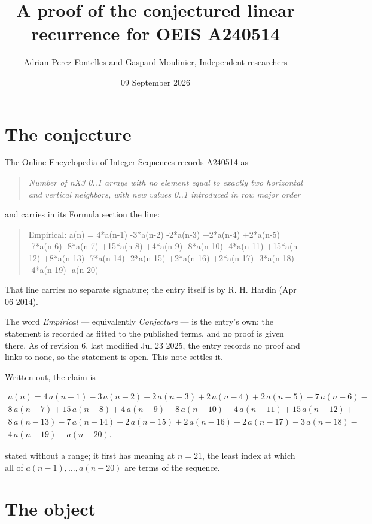 \documentclass[11pt]{article}
\title{A proof of the conjectured linear recurrence for OEIS A240514}
\author{Adrian Perez Fontelles and Gaspard Moulinier, Independent researchers}
\date{09 September 2026}
\theoremstyle{definition}
\begin{document}
\maketitle
\section{The conjecture}

The Online Encyclopedia of Integer Sequences records \href{https://oeis.org/A240514}{A240514} as

\begin{quote}\itshape Number of nX3 0..1 arrays with no element equal to exactly two horizontal and vertical neighbors, with new values 0..1 introduced in row major order\end{quote}

and carries in its Formula section the line:

\begin{quote}\ttfamily Empirical: a(n) = 4*a(n-1) -3*a(n-2) -2*a(n-3) +2*a(n-4) +2*a(n-5) -7*a(n-6) -8*a(n-7) +15*a(n-8) +4*a(n-9) -8*a(n-10) -4*a(n-11) +15*a(n-12) +8*a(n-13) -7*a(n-14) -2*a(n-15) +2*a(n-16) +2*a(n-17) -3*a(n-18) -4*a(n-19) -a(n-20)\end{quote}

That line carries no separate signature; the entry itself is by R. H. Hardin (Apr 06 2014).

The word {\itshape Empirical} --- equivalently {\itshape Conjecture} --- is the entry's own: the statement is recorded as fitted to the published terms, and no proof is given there. As of revision 6, last modified Jul 23 2025, the entry records no proof and links to none, so the statement is open. This note settles it.

Written out, the claim is

\begin{multline*} a(n) = 4\,a(n-1) - 3\,a(n-2) - 2\,a(n-3) + 2\,a(n-4) + 2\,a(n-5) - 7\,a(n-6) - \\ 8\,a(n-7) + 15\,a(n-8) + 4\,a(n-9) - 8\,a(n-10) - 4\,a(n-11) + 15\,a(n-12) + \\ 8\,a(n-13) - 7\,a(n-14) - 2\,a(n-15) + 2\,a(n-16) + 2\,a(n-17) - 3\,a(n-18) - \\ 4\,a(n-19) - a(n-20). \end{multline*}

stated without a range; it first has meaning at $n = 21$, the least index at which all of $a(n-1),\dots,a(n-20)$ are terms of the sequence.

\section{The object}
\end{document}
